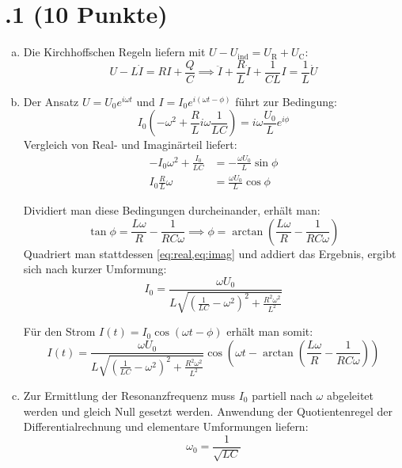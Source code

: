 \section*{\nr.1 \titone (10 Punkte)}
\begin{enumerate}[(a)]
\item Die Kirchhoffschen Regeln liefern mit $U-U_\text{ind}=U_\text{R} + U_\text{C}$:
\begin{equation}
U - L \dot{I} = R I + \frac{Q}{C} \implies  \ddot{I} + \frac{R}{L}\dot{I} +\frac{1}{CL}I = \frac{1}{L}\dot{U}
\end{equation}
\item Der Ansatz $U=U_0e^{i\omega t}$ und $I=I_0e^{i(\omega t -\phi)}$ führt zur Bedingung:
\begin{equation}
I_0 \left( -\omega^2+\frac{R}{L}i\omega \frac{1}{LC} \right) = i\omega \frac{U_0}{L}e^{i\phi}
\end{equation}
Vergleich von Real- und Imaginärteil liefert:
\begin{align}
-I_0 \omega^2 + \frac{I_0}{LC} &= -\frac{\omega U_0}{L}\sin{\phi} \label{eq:real}\\
I_0 \frac{R}{L}\omega &= \frac{\omega U_0}{L}\cos{\phi}\label{eq:imag}
\end{align}

Dividiert man diese Bedingungen durcheinander, erhält man:
\begin{equation}
\tan{\phi} = \frac{L\omega}{R} -\frac{1}{RC\omega} \implies \phi =\arctan\left(\frac{L\omega}{R} -\frac{1}{RC\omega} \right)
\end{equation}
 Quadriert man stattdessen \vref{eq:real,eq:imag} und addiert das Ergebnis, ergibt sich nach kurzer Umformung:
 \begin{equation}
I_0 = \frac{\omega U_0}{L\sqrt{\left(\frac{1}{LC} -\omega^2 \right)^2+\frac{R^2\omega^2}{L^2}}}
\end{equation}

Für den Strom $I(t) = I_0 \cos{(\omega t-\phi)}$ erhält man somit:
\begin{equation}
I(t) = \frac{\omega U_0}{L\sqrt{\left(\frac{1}{LC} -\omega^2 \right)^2+\frac{R^2\omega^2}{L^2}}} \cos{\left(\omega t-\arctan\left(\frac{L\omega}{R} -\frac{1}{RC\omega} \right)\right)}
\end{equation}

\item Zur Ermittlung der Resonanzfrequenz muss $I_0$ partiell nach $\omega$ abgeleitet werden und gleich Null gesetzt werden. Anwendung der Quotientenregel der Differentialrechnung und elementare Umformungen liefern:
\begin{equation}
\omega_0 = \frac{1}{\sqrt{LC}}
\end{equation}


\end{enumerate}
